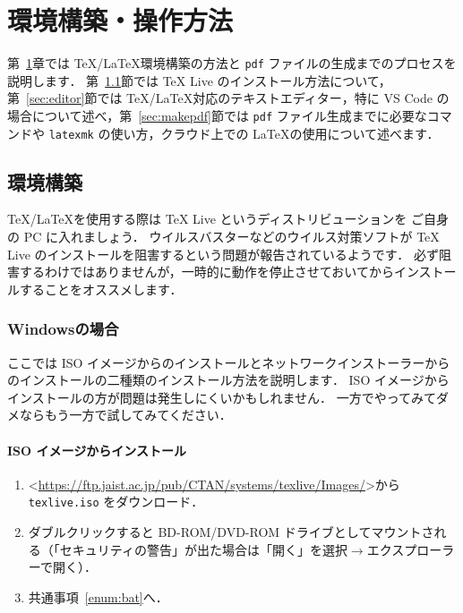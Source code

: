 \chapter{環境構築・操作方法}
\label{ch:howtouse}

第~\ref{ch:howtouse}章では \TeX/\LaTeX 環境構築の方法と \verb|pdf| ファイルの生成までのプロセスを説明します．
第~\ref{sec:environment}節では TeX Live のインストール方法について，第~\ref{sec:editor}節では \TeX/\LaTeX 対応のテキストエディター，特に VS Code の場合について述べ，第~\ref{sec:makepdf}節では \verb|pdf| ファイル生成までに必要なコマンドや \verb|latexmk| の使い方，クラウド上での \LaTeX の使用について述べます．

\section{環境構築}
\label{sec:environment}

\TeX/\LaTeX を使用する際は TeX Live というディストリビューションを ご自身の PC に入れましょう．
ウイルスバスターなどのウイルス対策ソフトが TeX Live のインストールを阻害するという問題が報告されているようです．
必ず阻害するわけではありませんが，一時的に動作を停止させておいてからインストールすることをオススメします．


\subsection{Windowsの場合}
\label{ssec:windows}

ここでは ISO イメージからのインストールとネットワークインストーラーからのインストールの二種類のインストール方法を説明します．
ISO イメージからインストールの方が問題は発生しにくいかもしれません．
一方でやってみてダメならもう一方で試してみてください．

\subsubsection*{ISO イメージからインストール}

\begin{enumerate}
    \item \textless\url{https://ftp.jaist.ac.jp/pub/CTAN/systems/texlive/Images/}\textgreater から \verb|texlive.iso| をダウンロード．
    \item ダブルクリックすると BD-ROM/DVD-ROM ドライブとしてマウントされる（「セキュリティの警告」が出た場合は「開く」を選択$\to$エクスプローラーで開く）．
    \item 共通事項~\ref{enum:bat}へ．
\end{enumerate}


